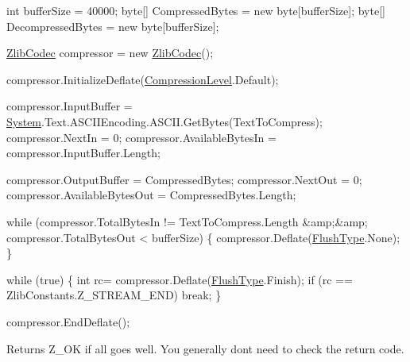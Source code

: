 \begin{DoxyCode}
\textcolor{keywordtype}{int} bufferSize = 40000;
byte[] CompressedBytes = \textcolor{keyword}{new} byte[bufferSize];
byte[] DecompressedBytes = \textcolor{keyword}{new} byte[bufferSize];

\mbox{\hyperlink{class_super_tiled2_unity_1_1_ionic_1_1_zlib_1_1_zlib_codec_afb741f3d8822709c3fe17ff284d537ab}{ZlibCodec}} compressor = \textcolor{keyword}{new} \mbox{\hyperlink{class_super_tiled2_unity_1_1_ionic_1_1_zlib_1_1_zlib_codec_afb741f3d8822709c3fe17ff284d537ab}{ZlibCodec}}();

compressor.InitializeDeflate(\mbox{\hyperlink{namespace_super_tiled2_unity_1_1_ionic_1_1_zlib_a20f6771804996c363f454ad9765cd7db}{CompressionLevel}}.Default);

compressor.InputBuffer = \mbox{\hyperlink{namespace_system}{System}}.Text.ASCIIEncoding.ASCII.GetBytes(TextToCompress);
compressor.NextIn = 0;
compressor.AvailableBytesIn = compressor.InputBuffer.Length;

compressor.OutputBuffer = CompressedBytes;
compressor.NextOut = 0;
compressor.AvailableBytesOut = CompressedBytes.Length;

\textcolor{keywordflow}{while} (compressor.TotalBytesIn != TextToCompress.Length &amp;&amp; compressor.TotalBytesOut < bufferSize)
\{
  compressor.Deflate(\mbox{\hyperlink{namespace_super_tiled2_unity_1_1_ionic_1_1_zlib_a2c5853fd63f03c83ac2458da1f4ff3bc}{FlushType}}.None);
\}

\textcolor{keywordflow}{while} (\textcolor{keyword}{true})
\{
  \textcolor{keywordtype}{int} rc= compressor.Deflate(\mbox{\hyperlink{namespace_super_tiled2_unity_1_1_ionic_1_1_zlib_a2c5853fd63f03c83ac2458da1f4ff3bc}{FlushType}}.Finish);
  \textcolor{keywordflow}{if} (rc == ZlibConstants.Z\_STREAM\_END) \textcolor{keywordflow}{break};
\}

compressor.EndDeflate();
\end{DoxyCode}
 

\begin{DoxyReturn}{Returns}
Z\+\_\+\+OK if all goes well. You generally don\textquotesingle{}t need to check the return code.
\end{DoxyReturn}
\mbox{\label{class_super_tiled2_unity_1_1_ionic_1_1_zlib_1_1_zlib_codec_aae6025281e278a40df628d36d5978489}} 

